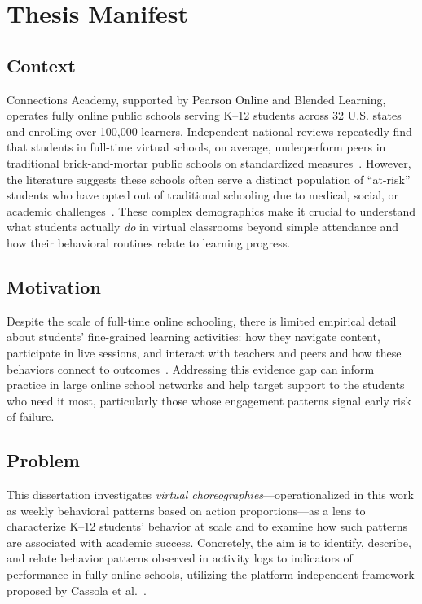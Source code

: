 \chapter{Thesis Manifest}
\label{chap:manifest}


\section{Context} \label{sec:context}
Connections Academy, supported by Pearson Online and Blended Learning, operates fully online public schools serving K--12 students across 32 U.S. states and enrolling over 100,000 learners.
Independent national reviews repeatedly find that students in full-time virtual schools, on average, underperform peers in traditional brick-and-mortar public schools on standardized measures~\cite{molnar_virtual_2023}.
However, the literature suggests these schools often serve a distinct population of ``at-risk'' students who have opted out of traditional schooling due to medical, social, or academic challenges~\cite{beck_prepared_2023}.
These complex demographics make it crucial to understand what students actually \emph{do} in virtual classrooms beyond simple attendance and how their behavioral routines relate to learning progress.

\section{Motivation} \label{sec:motivation}
Despite the scale of full-time online schooling, there is limited empirical detail about students' fine-grained learning activities: how they navigate content, participate in live sessions, and interact with teachers and peers and how these behaviors connect to outcomes~\cite{online_johnson_2022}.
Addressing this evidence gap can inform practice in large online school networks and help target support to the students who need it most, particularly those whose engagement patterns signal early risk of failure.

\section{Problem} \label{sec:problem}
This dissertation investigates \emph{virtual choreographies}---operationalized in this work as weekly behavioral patterns based on action proportions---as a lens to characterize K--12 students' behavior at scale and to examine how such patterns are associated with academic success.
Concretely, the aim is to identify, describe, and relate behavior patterns observed in activity logs to indicators of performance in fully online schools, utilizing the platform-independent framework proposed by Cassola et al.~\cite{cassola_using_2022}.

